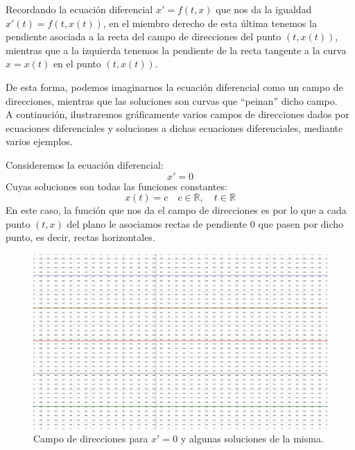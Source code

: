 Recordando la ecuación diferencial $x'=f(t,x)$ que nos da la igualdad ${x'(t) = f(t,x(t))}$, en el miembro derecho de esta última tenemos la pendiente asociada a la recta del campo de direcciones del punto $(t,x(t))$, mientras que a la izquierda tenemos la pendiente de la recta tangente a la curva $x=x(t)$ en el punto $(t,x(t))$.

De esta forma, podemos imaginarnos la ecuación diferencial como un campo de direcciones, mientras que las soluciones son curvas que ``peinan'' dicho campo.\\

A continución, ilustraremos gráficamente varios campos de direcciones dados por ecuaciones diferenciales y soluciones a dichas ecuaciones diferenciales, mediante varios ejemplos.

\begin{ejemplo}
    Consideremos la ecuación diferencial:
    \begin{equation*}
        x' = 0
    \end{equation*}
    Cuyas soluciones son todas las funciones constantes:
    \begin{equation*}
        x(t) = c \quad c\in \mathbb{R}, \quad t\in \mathbb{R}
    \end{equation*}
    En este caso, la función que nos da el campo de direcciones es
    por lo que a cada punto $(t,x)$ del plano le asociamos rectas de pendiente 0 que pasen por dicho punto, es decir, rectas horizontales.

    \begin{figure}[H]
        \centering
        \includegraphics[width=0.6\linewidth]{Imagenes/campo_direcciones_1.png}
        \caption{Campo de direcciones para $x'=0$ y algunas soluciones de la misma.}
    \end{figure}
\end{ejemplo}

